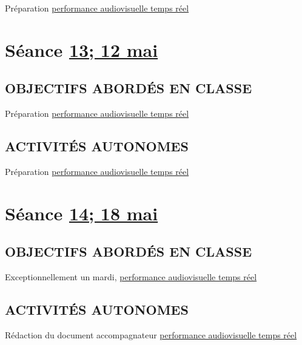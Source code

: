 \documentclass[
  french,
]{book}
\begin{document}
Préparation \protect\hyperlink{sommatif_5}{performance audiovisuelle temps réel}

\hypertarget{semaine_15}{%
\section{\texorpdfstring{Séance \protect\hyperlink{semaine_15}{13; 12 mai}}{Séance 13; 12 mai}}\label{semaine_15}}

\hypertarget{objectifs-aborduxe9s-en-classe-14}{%
\subsection{OBJECTIFS ABORDÉS EN CLASSE}\label{objectifs-aborduxe9s-en-classe-14}}

Préparation \protect\hyperlink{sommatif_5}{performance audiovisuelle temps réel}

\hypertarget{activituxe9s-autonomes-14}{%
\subsection{ACTIVITÉS AUTONOMES}\label{activituxe9s-autonomes-14}}

Préparation \protect\hyperlink{sommatif_5}{performance audiovisuelle temps réel}

\hypertarget{semaine_16}{%
\section{\texorpdfstring{Séance \protect\hyperlink{semaine_16}{14; 18 mai}}{Séance 14; 18 mai}}\label{semaine_16}}

\hypertarget{objectifs-aborduxe9s-en-classe-15}{%
\subsection{OBJECTIFS ABORDÉS EN CLASSE}\label{objectifs-aborduxe9s-en-classe-15}}

Exceptionnellement un mardi,
\protect\hyperlink{sommatif_5}{performance audiovisuelle temps réel}

\hypertarget{activituxe9s-autonomes-15}{%
\subsection{ACTIVITÉS AUTONOMES}\label{activituxe9s-autonomes-15}}

Rédaction du document accompagnateur \protect\hyperlink{sommatif_5}{performance audiovisuelle temps réel}
\end{document}
